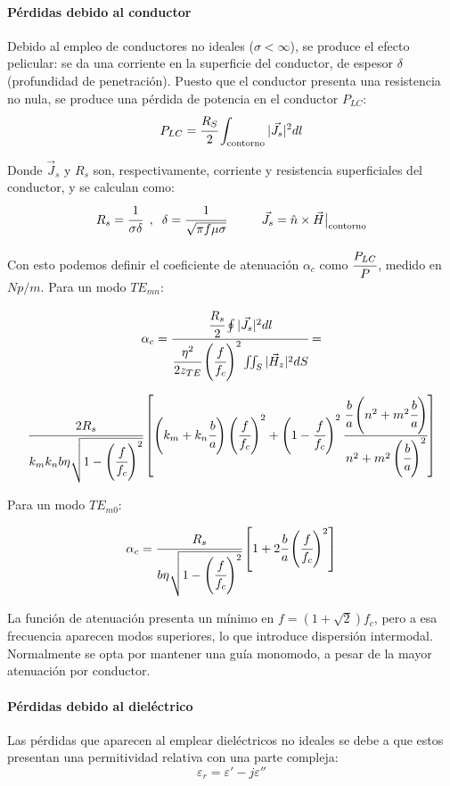 \documentclass[12pt]{article}
\begin{document}
\paragraph{P\'erdidas debido al conductor}
Debido al empleo de conductores no ideales ($\sigma<\infty$), se produce el efecto pelicular: se da una corriente en la superficie del conductor, de espesor $\delta$ (profundidad de penetraci\'on). Puesto que el conductor presenta una resistencia no nula, se produce una p\'erdida de potencia en el conductor $P_{LC}$:
$$P_{LC} = \cfrac{R_S}{2} \int_{\text{contorno}}|\vec{J}_s|^2 dl$$

Donde $\vec{J}_s$ y $R_s$ son, respectivamente, corriente y resistencia superficiales del conductor, y se calculan como:
$$R_s = \cfrac{1}{\sigma\delta}\hspace{0.2cm}, \hspace{0.2cm}\delta = \cfrac{1}{\sqrt{\pi f \mu \sigma}} \hspace{1cm}\vec{J}_s = \hat{n} \times\vec{H}\big|_{\text{contorno}}$$

Con esto podemos definir el coeficiente de atenuaci\'on $\alpha_c$ como $\cfrac{P_{LC}}{P}$, medido en $Np/m$. Para un modo $TE_{mn}$:

$$\alpha_c = \cfrac{\cfrac{R_s}{2} \oint |\vec{J}_s|^2 dl}{\cfrac{\eta^2}{2z_{TE}}\left(\cfrac{f}{f_c}\right)^2 \iint_S |\vec{H}_z|^2 dS} = $$

$$\cfrac{2R_s}{k_mk_nb\eta\sqrt{1-\left(\cfrac{f}{f_c}\right)^2}}\left[\left(k_m+k_n\cfrac{b}{a}\right)\left(\cfrac{f}{f_c}\right)^2+  \left(1-\cfrac{f}{f_c}\right)^2\cfrac{\cfrac{b}{a}\left(n^2+m^2\cfrac{b}{a}\right)}{n^2+m^2\left(\cfrac{b}{a}\right)^2}\right]$$


Para un modo $TE_{m0}$:

$$\alpha_c = \cfrac{R_s}{b\eta\sqrt{1-\left(\cfrac{f}{f_c}\right)^2}}\left[1+2\cfrac{b}{a}\left(\cfrac{f}{f_c}\right)^2\right]$$

La funci\'on de atenuaci\'on presenta un m\'inimo en $f = (1+\sqrt{2})f_c$, pero a esa frecuencia aparecen modos superiores, lo que introduce dispersi\'on intermodal. Normalmente se opta por mantener una gu\'ia monomodo, a pesar de la mayor atenuaci\'on por conductor.

\paragraph{P\'erdidas debido al diel\'ectrico}

Las p\'erdidas que aparecen al emplear diel\'ectricos no ideales se debe a que estos presentan una permitividad relativa con una parte compleja:
$$\varepsilon_r = \varepsilon' -j\varepsilon''$$
\end{document}
